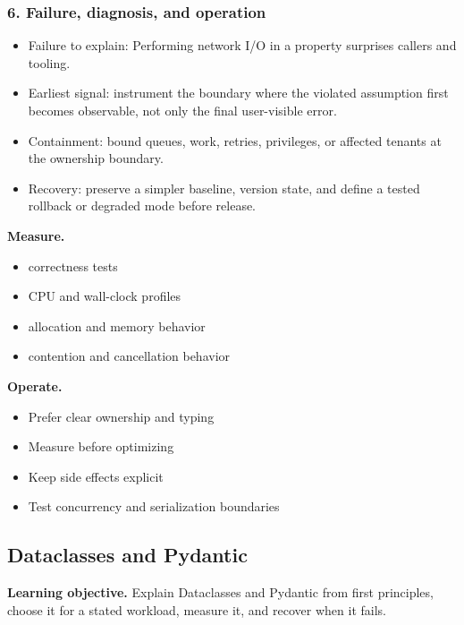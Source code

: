 \subsubsection*{6. Failure, diagnosis, and operation}
\begin{itemize}
\item Failure to explain: Performing network I/O in a property surprises callers and tooling.
\item Earliest signal: instrument the boundary where the violated assumption first becomes observable, not only the final user-visible error.
\item Containment: bound queues, work, retries, privileges, or affected tenants at the ownership boundary.
\item Recovery: preserve a simpler baseline, version state, and define a tested rollback or degraded mode before release.
\end{itemize}
\textbf{Measure.}\begin{itemize}
\item correctness tests
\item CPU and wall-clock profiles
\item allocation and memory behavior
\item contention and cancellation behavior
\end{itemize}
\textbf{Operate.}\begin{itemize}
\item Prefer clear ownership and typing
\item Measure before optimizing
\item Keep side effects explicit
\item Test concurrency and serialization boundaries
\end{itemize}
\subsection{Dataclasses and Pydantic}
\textbf{Learning objective.} Explain Dataclasses and Pydantic from first principles, choose it for a stated workload, measure it, and recover when it fails.
